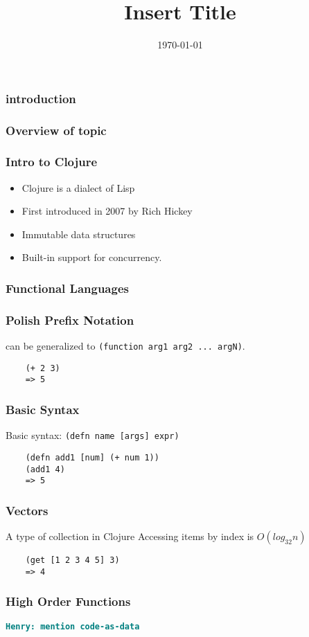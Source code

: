 \documentclass{beamer}
\newcommand{\comment}[1]{{\bf \tt  {#1}}}
\newcommand{\hfcomment}[1]{\textcolor{Teal}{\comment{Henry: {#1}}}}
\newcommand{\clocode}[1]{{\texttt {#1}}}
\begin{document}
\title{Insert Title}
\date{\today}


\begin{frame}[fragile]
	\frametitle{introduction}

\end{frame}

\begin{frame}[fragile]
\frametitle{Overview of topic}
\end{frame}

\begin{frame}[fragile]
\frametitle{Intro to Clojure}
	\begin{itemize}
  	 \item Clojure is a dialect of Lisp
  	 \item First introduced in 2007 by Rich Hickey
  	 \item Immutable data structures
       \item Built-in support for concurrency.
	\end{itemize}
\end{frame}

\begin{frame}[fragile]
\frametitle{Functional Languages}
\end{frame}

\begin{frame}[fragile]
\frametitle{Polish Prefix Notation}
can be generalized to \clocode{(function arg1 arg2 ... argN)}.
	\begin{verbatim}
	(+ 2 3)
	=> 5
	\end{verbatim}
\end{frame}

\begin{frame}[fragile]
\frametitle{Basic Syntax}
Basic syntax: \clocode{(defn name [args] expr)}
	\begin{verbatim}
	(defn add1 [num] (+ num 1))
	(add1 4)
	=> 5
	\end{verbatim}
\end{frame}

\begin{frame}[fragile]
\frametitle{Vectors}
A type of collection in Clojure
Accessing items by index is $O(log_{32}n)$
	\begin{verbatim}
	(get [1 2 3 4 5] 3)	
	=> 4
	\end{verbatim}
\end{frame}

\begin{frame}[fragile]
\frametitle{High Order Functions}
\hfcomment{mention code-as-data}
\end{frame}
\end{document}
